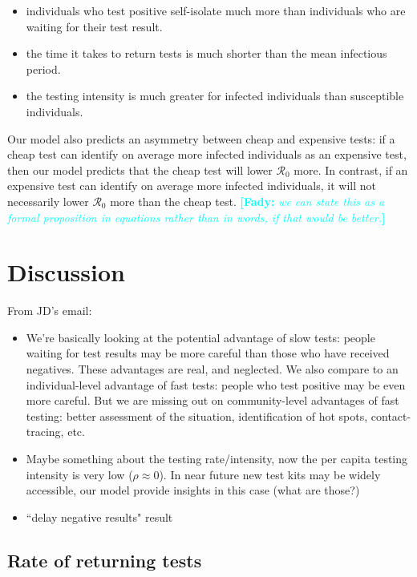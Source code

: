 \documentclass[12pt]{article}
\newcommand{\comment}{\showcomment}
\newcommand{\showcomment}[3]{\textcolor{#1}{\textbf{[#2: }\textsl{#3}\textbf{]}}}
\newcommand{\fady}[1]{\comment{cyan}{Fady}{#1}}
\newcommand{\Rnum}{\mathcal{R}_0}
\theoremstyle{definition} %
\begin{document}
\begin{itemize}
    \item individuals who test positive self-isolate much more than individuals who are waiting for their test result.
    \item the time it takes to return tests is much shorter than the mean infectious period.
    \item the testing intensity is much greater for infected individuals than susceptible individuals.
\end{itemize}

Our model also predicts an asymmetry between cheap and expensive tests: if a cheap test can identify on average more infected individuals as an expensive test, then our model predicts that the cheap test will lower $\Rnum$ more. In contrast, if an expensive test can identify on average more infected individuals, it will not necessarily lower $\Rnum$ more than the cheap test. \fady{we can state this as a formal proposition in equations rather than in words, if that would be better.}


\section{Discussion}

From JD's email:

\begin{itemize}

  \item We're basically looking at the potential advantage of slow tests:
people waiting for test results may be more careful than those who
have received negatives. These advantages are real, and neglected. We
also compare to an individual-level advantage of fast tests: people
who test positive may be even more careful. But we are missing out on
community-level advantages of fast testing: better assessment of the
situation, identification of hot spots, contact-tracing, etc. 
\item  Maybe something about the testing rate/intensity, now the per capita testing intensity is very low ($\rho \approx 0$). In near future new test kits may be widely accessible, our model provide insights in this case (what are those?)
\item ``delay negative results" result

\end{itemize}

\subsection{Rate of returning tests}
\end{document}
